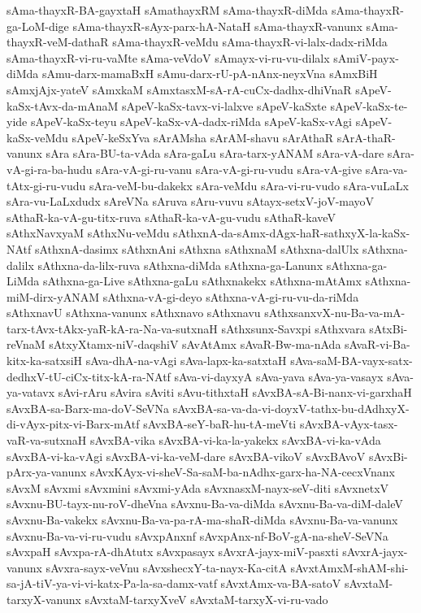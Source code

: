 {sAma-thayxR-BA-gayxtaH
sAmathayxRM
sAma-thayxR-diMda
sAma-thayxR-ga-LoM-dige
sAma-thayxR-sAyx-parx-hA-NataH
sAma-thayxR-vanunx
sAma-thayxR-veM-dathaR
sAma-thayxR-veMdu
sAma-thayxR-vi-lalx-dadx-riMda
sAma-thayxR-vi-ru-vaMte
sAma-veVdoV
sAmayx-vi-ru-vu-dilalx
sAmiV-payx-diMda
sAmu-darx-mamaBxH
sAmu-darx-rU-pA-nAnx-neyxVna
sAmxBiH
sAmxjAjx-yateV
sAmxkaM
sAmxtasxM-sA-rA-cuCx-dadhx-dhiVnaR
sApeV-kaSx-tAvx-da-mAnaM
sApeV-kaSx-tavx-vi-lalxve
sApeV-kaSxte
sApeV-kaSx-te-yide
sApeV-kaSx-teyu
sApeV-kaSx-vA-dadx-riMda
sApeV-kaSx-vAgi
sApeV-kaSx-veMdu
sApeV-keSxYva
sArAMsha
sArAM-shavu
sArAthaR
sArA-thaR-vanunx
sAra
sAra-BU-ta-vAda
sAra-gaLu
sAra-tarx-yANAM
sAra-vA-dare
sAra-vA-gi-ra-ba-hudu
sAra-vA-gi-ru-vanu
sAra-vA-gi-ru-vudu
sAra-vA-give
sAra-va-tAtx-gi-ru-vudu
sAra-veM-bu-dakekx
sAra-veMdu
sAra-vi-ru-vudo
sAra-vuLaLx
sAra-vu-LaLxdudx
sAreVNa
sAruva
sAru-vuvu
sAtayx-setxV-joV-mayoV
sAthaR-ka-vA-gu-titx-ruva
sAthaR-ka-vA-gu-vudu
sAthaR-kaveV
sAthxNavxyaM
sAthxNu-veMdu
sAthxnA-da-sAmx-dAgx-haR-sathxyX-la-kaSx-NAtf
sAthxnA-dasimx
sAthxnAni
sAthxna
sAthxnaM
sAthxna-dalUlx
sAthxna-dalilx
sAthxna-da-lilx-ruva
sAthxna-diMda
sAthxna-ga-Lanunx
sAthxna-ga-LiMda
sAthxna-ga-Live
sAthxna-gaLu
sAthxnakekx
sAthxna-mAtAmx
sAthxna-miM-dirx-yANAM
sAthxna-vA-gi-deyo
sAthxna-vA-gi-ru-vu-da-riMda
sAthxnavU
sAthxna-vanunx
sAthxnavo
sAthxnavu
sAthxsanxvX-nu-Ba-va-mA-tarx-tAvx-tAkx-yaR-kA-ra-Na-va-sutxnaH
sAthxsunx-Savxpi
sAthxvara
sAtxBi-reVnaM
sAtxyXtamx-niV-daqshiV
sAvAtAmx
sAvaR-Bw-ma-nAda
sAvaR-vi-Ba-kitx-ka-satxsiH
sAva-dhA-na-vAgi
sAva-lapx-ka-satxtaH
sAva-saM-BA-vayx-satx-dedhxV-tU-ciCx-titx-kA-ra-NAtf
sAva-vi-dayxyA
sAva-yava
sAva-ya-vasayx
sAva-ya-vatavx
sAvi-rAru
sAvira
sAviti
sAvu-tithxtaH
sAvxBA-sA-Bi-nanx-vi-garxhaH
sAvxBA-sa-Barx-ma-doV-SeVNa
sAvxBA-sa-va-da-vi-doyxV-tathx-bu-dAdhxyX-di-vAyx-pitx-vi-Barx-mAtf
sAvxBA-seY-baR-hu-tA-meVti
sAvxBA-vAyx-tasx-vaR-va-sutxnaH
sAvxBA-vika
sAvxBA-vi-ka-la-yakekx
sAvxBA-vi-ka-vAda
sAvxBA-vi-ka-vAgi
sAvxBA-vi-ka-veM-dare
sAvxBA-vikoV
sAvxBAvoV
sAvxBi-pArx-ya-vanunx
sAvxKAyx-vi-sheV-Sa-saM-ba-nAdhx-garx-ha-NA-cecxVnanx
sAvxM
sAvxmi
sAvxmini
sAvxmi-yAda
sAvxnasxM-nayx-seV-diti
sAvxnetxV
sAvxnu-BU-tayx-nu-roV-dheVna
sAvxnu-Ba-va-diMda
sAvxnu-Ba-va-diM-daleV
sAvxnu-Ba-vakekx
sAvxnu-Ba-va-pa-rA-ma-shaR-diMda
sAvxnu-Ba-va-vanunx
sAvxnu-Ba-va-vi-ru-vudu
sAvxpAnxnf
sAvxpAnx-nf-BoV-gA-na-sheV-SeVNa
sAvxpaH
sAvxpa-rA-dhAtutx
sAvxpasayx
sAvxrA-jayx-miV-pasxti
sAvxrA-jayx-vanunx
sAvxra-sayx-veVnu
sAvxshecxY-ta-nayx-Ka-citA
sAvxtAmxM-shAM-shi-sa-jA-tiV-ya-vi-vi-katx-Pa-la-sa-damx-vatf
sAvxtAmx-va-BA-satoV
sAvxtaM-tarxyX-vanunx
sAvxtaM-tarxyXveV
sAvxtaM-tarxyX-vi-ru-vado
}

